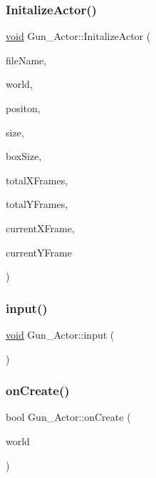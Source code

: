 \mbox{\label{classGun__Actor_a67441e510402f639e72b1cbef279e275}} 
\subsubsection{\texorpdfstring{Initalize\+Actor()}{InitalizeActor()}}
{\footnotesize\ttfamily \hyperlink{imgui__impl__opengl3__loader_8h_ac668e7cffd9e2e9cfee428b9b2f34fa7}{void} Gun\+\_\+\+Actor\+::\+Initalize\+Actor (\begin{DoxyParamCaption}\item[{const char $\ast$}]{file\+Name,  }\item[{b2\+World $\ast$}]{world,  }\item[{glm\+::vec2}]{positon,  }\item[{glm\+::vec2}]{size,  }\item[{glm\+::vec2}]{box\+Size,  }\item[{int}]{total\+X\+Frames,  }\item[{int}]{total\+Y\+Frames,  }\item[{int}]{current\+X\+Frame,  }\item[{int}]{current\+Y\+Frame }\end{DoxyParamCaption})}

\mbox{\label{classGun__Actor_a71644f2f094ac3d33fd8018c4290f46a}} 
\subsubsection{\texorpdfstring{input()}{input()}}
{\footnotesize\ttfamily \hyperlink{imgui__impl__opengl3__loader_8h_ac668e7cffd9e2e9cfee428b9b2f34fa7}{void} Gun\+\_\+\+Actor\+::input (\begin{DoxyParamCaption}{ }\end{DoxyParamCaption})}

\mbox{\label{classGun__Actor_afd8cf48e6c4a2371b0b00d6ba5dd0392}} 
\subsubsection{\texorpdfstring{on\+Create()}{onCreate()}}
{\footnotesize\ttfamily bool Gun\+\_\+\+Actor\+::on\+Create (\begin{DoxyParamCaption}\item[{b2\+World \&}]{world }\end{DoxyParamCaption})}


